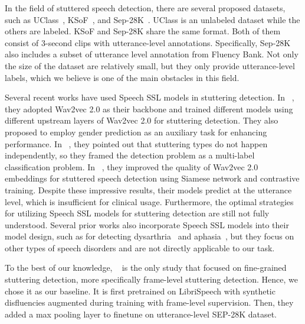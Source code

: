 In the field of stuttered speech detection, there are several proposed datasets, such as UClass~\cite{Howell_uclass}, KSoF~\cite{bayerl_KSoFKasselState_2022}, and Sep-28K~\cite{lea_Sep28k}.
UClass is an unlabeled dataset while the others are labeled.
KSoF and Sep-28K share the same format.
Both of them consist of 3-second clips with utterance-level annotations.
Specifically, Sep-28K also includes a subset of utterance level annotation from Fluency Bank.
Not only the size of the dataset are relatively small, but they only provide 
utterance-level labels,
which we believe is one of the main obstacles in this field.

Several recent works have used Speech SSL models in stuttering detection.
In ~\cite{bayerl22b_interspeech}, they adopted Wav2vec 2.0 as their backbone and trained different models using different upstream layers of Wav2vec 2.0 for stuttering detection.
They also proposed to employ gender prediction as an auxiliary task for enhancing performance.
In ~\cite{bayerl23_interspeech}, they pointed out that stuttering types do not happen independently, so they framed the detection problem as a multi-label classification problem.
In ~\cite{Payal_iccasp_Siamese}, they improved the quality of Wav2vec 2.0 embeddings for stuttered speech detection using Siamese network and contrastive training. 
Despite these impressive results, their models predict at the utterance level, which is insufficient for clinical usage.
Furthermore, the optimal strategies for utilizing Speech SSL models for stuttering detection are still not fully understood.
Several prior works also incorporate Speech SSL models into their model design, such as for detecting dysarthria~\cite{Farhad_Dysarthria} and aphasia~\cite{Lian2023UnconstrainedDM,Lian2024TowardsHS}, but they focus on other types of speech disorders and are not directly applicable to our task.

To the best of our knowledge, ~\cite{harvill22_interspeech} is the only study that focused on fine-grained stuttering detection, more specifically frame-level stuttering detection.
Hence, we chose it as our baseline.
It is first pretrained on LibriSpeech with synthetic disfluencies augmented during training with frame-level supervision.
Then, they added a max pooling layer to finetune on utterance-level SEP-28K dataset.

